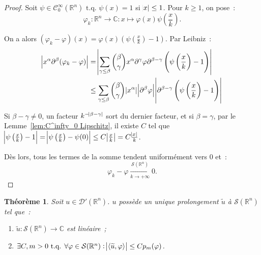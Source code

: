 \documentclass{report}
\newcommand{\C}{{\mathbb C}}
\newcommand{\R}{{\mathbb R}}
\newcommand{\scpr}[2]{\left\langle#1, #2\right\rangle}
\newcommand{\tq}{\text{ t.q. }}
\newcommand{\st}{\tq}
\newcommand{\pinfty}{{+\infty}}
\newtheorem{thm}{Théorème}[chapter]
\theoremstyle{definition}
\theoremstyle{remark}
\begin{document}
\begin{proof} Soit $\psi \in \mathcal C^\infty_0(\R^n) \st \psi(x) = 1$ si $\abs x \leq 1$. Pour $k \geq 1$, on pose~:
\[\varphi_k : \R^n \to \C : x \mapsto \varphi(x)\psi\left(\frac xk\right).\]

On a alors $(\varphi_k-\varphi)(x) = \varphi(x)\left(\psi\left(\frac xk\right)-1\right)$. Par Leibniz~:
\begin{align*}
	\abs {x^\alpha\partial^\beta(\varphi_k-\varphi)}
	&= \abs {\sum_{\gamma \leq \beta}\binom \beta\gamma x^\alpha\partial^\gamma\varphi\partial^{\beta-\gamma}\left(\psi\left(\frac xk\right)-1\right)} \\
	&\leq \sum_{\gamma\leq\beta}\binom\beta\gamma\abs {x^\alpha}\abs {\partial^\beta\varphi}\abs {\partial^{\beta-\gamma}\left(\psi\left(\frac xk\right)-1\right)}
\end{align*}

Si $\beta - \gamma \neq 0$, un facteur $k^{-\abs{\beta-\gamma}}$ sort du dernier facteur, et si $\beta=\gamma$, par le Lemme~\ref{lem:C^infty_0 Lipschitz}, il existe $C$ tel que
$\abs {\psi\left(\frac xk\right)-1} = \abs {\psi\left(\frac xk\right) - \psi(0)} \leq C\abs {\frac xk} = C\frac {\abs x}k$.

Dès lors, tous les termes de la somme tendent uniformément vers 0 et~:
\[\varphi_k-\varphi \xrightarrow[k \to \pinfty]{\mathcal S(\R^n)} 0.\]
\end{proof}

\begin{thm} Soit $u \in \mathcal D'(\R^n)$. $u$ possède un unique prolongement $\widetilde u$ à $\mathcal S(\R^n)$ tel que~:
\begin{enumerate}
	\item $\widetilde u : \mathcal S(\R^n) \to \C$ est linéaire~;
	\item $\exists C, m > 0 \st \forall \varphi \in \mathcal S(\R^n) : \abs {\scpr {\widetilde u}\varphi} \leq Cp_m(\varphi)$.
\end{enumerate}
\end{thm}
\end{document}
